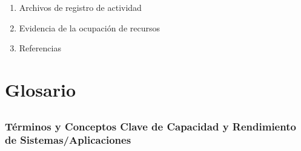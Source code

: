\documentclass[
  paper=a4,
  ,captions=tableheading
]{scrartcl}
\providecommand{\tightlist}{%
  \setlength{\itemsep}{0pt}\setlength{\parskip}{0pt}}
\renewenvironment{quote}{\begin{customblockquote}\list{}{\rightmargin=0em\leftmargin=0em}%
\item\relax\color{blockquote-text}\ignorespaces}{\unskip\unskip\endlist\end{customblockquote}}
\begin{document}
\begin{enumerate}
\def\labelenumi{\arabic{enumi}.}
\tightlist
\item
  Archivos de registro de actividad
\item
  Evidencia de la ocupación de recursos
\item
  Referencias
\end{enumerate}

\newpage

\section{Glosario}\label{sec:glosario}

\subsection{}\label{sec:section}

\begin{quote}
\end{quote}

\subsubsection{Términos y Conceptos Clave de Capacidad y Rendimiento de
Sistemas/Aplicaciones}\label{sec:tuxe9rminos-y-conceptos-clave-de-capacidad-y-rendimiento-de-sistemasaplicaciones}
\end{document}
